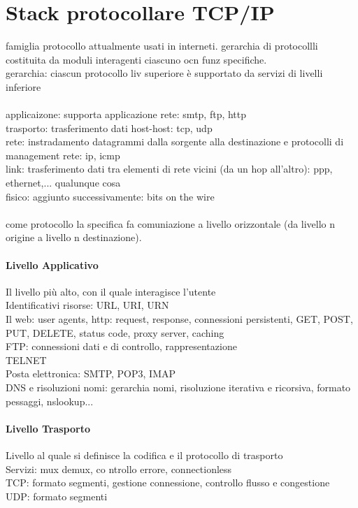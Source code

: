\documentclass[10pt]{article}
\begin{document}
\section{Stack protocollare TCP/IP}
famiglia protocollo attualmente usati in interneti. gerarchia di protocollli costituita da moduli interagenti ciascuno ocn funz specifiche.\\
gerarchia: ciascun protocollo liv superiore è supportato da servizi di livelli inferiore\\\\
applicaizone: supporta applicazione rete: smtp, ftp, http\\
trasporto: trasferimento dati host-host: tcp, udp\\
rete: instradamento datagrammi dalla sorgente alla destinazione e protocolli di management rete: ip, icmp\\
link: trasferimento dati tra elementi di rete vicini (da un hop all'altro): ppp, ethernet,... qualunque cosa\\
fisico: aggiunto successivamente: bits on the wire\\\\
come protocollo la specifica fa comuniazione a livello orizzontale (da livello n origine a livello n destinazione).\\
\paragraph{Livello Applicativo} Il livello più alto, con il quale interagisce l'utente\\
Identificativi risorse: URL, URI, URN\\
Il web: user agents, http: request, response, connessioni persistenti, GET, POST, PUT, DELETE, status code, proxy server, caching\\
FTP: connessioni dati e di controllo, rappresentazione\\
TELNET\\
Posta elettronica: SMTP, POP3, IMAP\\
DNS e risoluzioni nomi: gerarchia nomi, risoluzione iterativa e ricorsiva, formato pessaggi, nslookup...\\
\paragraph{Livello Trasporto} Livello al quale si definisce la codifica e il protocollo di trasporto\\
Servizi: mux demux, co ntrollo errore, connectionless\\
TCP: formato segmenti, gestione connessione, controllo flusso e congestione\\
UDP: formato segmenti\\
\end{document}
